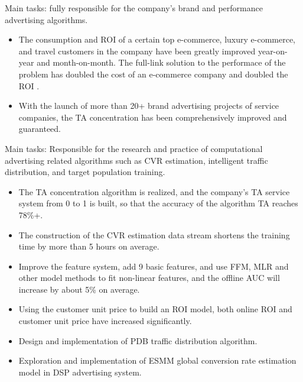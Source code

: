 \documentclass{resume}
\begin{document}
\begin{onehalfspacing}
Main tasks: fully responsible for the company's brand and performance advertising algorithms.
\begin{itemize}
\item The consumption and ROI of a certain top e-commerce, luxury e-commerce, and travel customers in the company have been greatly improved year-on-year and month-on-month. The full-link solution to the performace of the problem has doubled the cost of an e-commerce company and doubled the ROI .
\item With the launch of more than 20+ brand advertising projects of service companies, the TA concentration has been comprehensively improved and guaranteed.
\end{itemize}
\end{onehalfspacing}

\begin{onehalfspacing}
Main tasks: Responsible for the research and practice of computational advertising related algorithms such as CVR estimation, intelligent traffic distribution, and target population training.
\begin{itemize}
\item The TA concentration algorithm is realized, and the company's TA service system from 0 to 1 is built, so that the accuracy of the algorithm TA reaches 78\%+. 
\item The construction of the CVR estimation data stream shortens the training time by more than 5 hours on average.
\item Improve the feature system, add 9 basic features, and use FFM, MLR and other model methods to fit non-linear features, and the offline AUC will increase by about 5\% on average.
\item Using the customer unit price to build an ROI model, both online ROI and customer unit price have increased significantly.
\item Design and implementation of PDB traffic distribution algorithm.
\item Exploration and implementation of ESMM global conversion rate estimation model in DSP advertising system.
\end{itemize}
\end{onehalfspacing}
\end{document}
